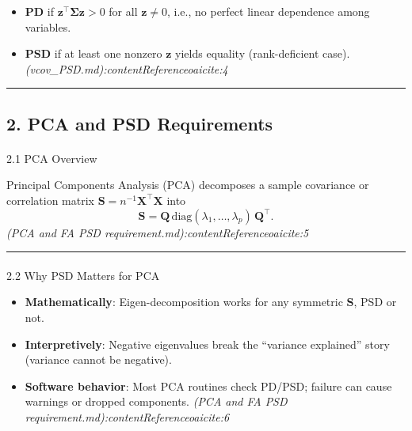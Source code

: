\documentclass[
  letterpaper,
  DIV=11,
  numbers=noendperiod]{scrartcl}
\makeatletter
\let\oldparagraph\paragraph
\renewcommand{\paragraph}{
    \@ifstar
      \xxxParagraphStar
      \xxxParagraphNoStar
  }
\newcommand{\xxxParagraphStar}[1]{\oldparagraph*{#1}\mbox{}}
\newcommand{\xxxParagraphNoStar}[1]{\oldparagraph{#1}\mbox{}}
\providecommand{\tightlist}{%
  \setlength{\itemsep}{0pt}\setlength{\parskip}{0pt}}
\theoremstyle{remark}
\makeatother
\begin{document}
\begin{itemize}
\tightlist
\item
  \textbf{PD} if \(\mathbf{z}^\top \mathbf{\Sigma} \mathbf{z} > 0\) for
  all \(\mathbf{z} \neq 0\), i.e., no perfect linear dependence among
  variables.
\item
  \textbf{PSD} if at least one nonzero \(\mathbf{z}\) yields equality
  (rank-deficient case).
  \emph{(vcov\_PSD.md):contentReference{oaicite:4}}
\end{itemize}

\begin{center}\rule{0.5\linewidth}{0.5pt}\end{center}

\subsection{2. PCA and PSD Requirements}\label{pca-and-psd-requirements}

\paragraph{2.1 PCA Overview}\label{pca-overview}

Principal Components Analysis (PCA) decomposes a sample covariance or
correlation matrix \(\mathbf{S} = n^{-1} \mathbf{X}^\top \mathbf{X}\)
into \[
\mathbf{S} = \mathbf{Q} \,\mathrm{diag}(\lambda_1,\dots,\lambda_p)\, \mathbf{Q}^\top.
\] \emph{(PCA and FA PSD requirement.md):contentReference{oaicite:5}}

\begin{center}\rule{0.5\linewidth}{0.5pt}\end{center}

\paragraph{2.2 Why PSD Matters for PCA}\label{why-psd-matters-for-pca}

\begin{itemize}
\tightlist
\item
  \textbf{Mathematically}: Eigen-decomposition works for any symmetric
  \(\mathbf{S}\), PSD or not.
\item
  \textbf{Interpretively}: Negative eigenvalues break the ``variance
  explained'' story (variance cannot be negative).
\item
  \textbf{Software behavior}: Most PCA routines check PD/PSD; failure
  can cause warnings or dropped components. \emph{(PCA and FA PSD
  requirement.md):contentReference{oaicite:6}}
\end{itemize}
\end{document}
